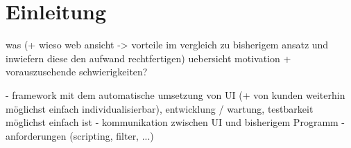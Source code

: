 \chapter{Einleitung}

was (+ wieso web ansicht -> vorteile im vergleich zu bisherigem ansatz und inwiefern diese den aufwand rechtfertigen)
uebersicht
motivation + vorauszusehende schwierigkeiten?

 


    


- framework mit dem automatische umsetzung von UI (+ von kunden weiterhin möglichst einfach individualisierbar), entwicklung / wartung, testbarkeit möglichst einfach ist
- kommunikation zwischen UI und bisherigem Programm
- anforderungen (scripting, filter, ...)
